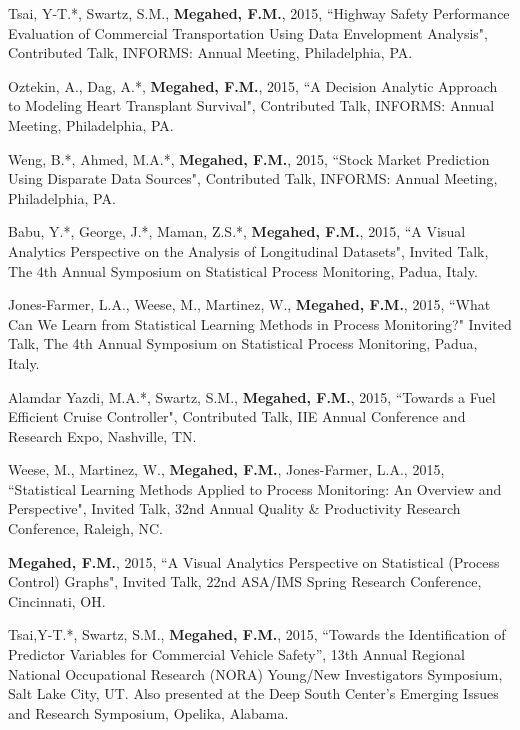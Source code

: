 \documentclass[margin,line]{res}
\begin{document}
\begin{resume}
\vspace{-1.5mm} 
Tsai, Y-T.*, Swartz, S.M., \textbf{Megahed, F.M.}, 2015, ``Highway Safety Performance Evaluation of Commercial Transportation Using Data Envelopment Analysis", Contributed Talk, INFORMS: Annual Meeting, Philadelphia, PA.

\vspace{-1.5mm} 
Oztekin, A., Dag, A.*, \textbf{Megahed, F.M.}, 2015, ``A Decision Analytic Approach to Modeling Heart Transplant Survival", Contributed Talk, INFORMS: Annual Meeting, Philadelphia, PA.

\vspace{-1.5mm} 
Weng, B.*, Ahmed, M.A.*, \textbf{Megahed, F.M.}, 2015, ``Stock Market Prediction Using Disparate Data Sources", Contributed Talk, INFORMS: Annual Meeting, Philadelphia, PA.

\vspace{-1.5mm} 
Babu, Y.*, George, J.*, Maman, Z.S.*, \textbf{Megahed, F.M.}, 2015, ``A Visual Analytics Perspective on the Analysis of Longitudinal Datasets", Invited Talk, The 4th Annual Symposium on Statistical Process Monitoring, Padua, Italy.

\vspace{-1.5mm} 
Jones-Farmer, L.A., Weese, M., Martinez, W., \textbf{Megahed, F.M.}, 2015, ``What Can We Learn from Statistical Learning Methods in Process Monitoring?" Invited Talk, The 4th Annual Symposium on Statistical Process Monitoring, Padua, Italy.

\vspace{-1.5mm} 
Alamdar Yazdi, M.A.*, Swartz, S.M., \textbf{Megahed, F.M.}, 2015, ``Towards a Fuel Efficient Cruise Controller", Contributed Talk, IIE Annual Conference and Research Expo, Nashville, TN.

\vspace{-1.5mm} 
Weese, M., Martinez, W., \textbf{Megahed, F.M.}, Jones-Farmer, L.A., 2015, ``Statistical Learning Methods Applied to Process Monitoring: An Overview and Perspective", Invited Talk, 32nd Annual Quality \& Productivity Research Conference, Raleigh, NC.

\vspace{-1.5mm}
\textbf{Megahed, F.M.}, 2015, ``A Visual Analytics Perspective on Statistical (Process Control) Graphs", Invited Talk, 22nd ASA/IMS Spring Research Conference, Cincinnati, OH.

\vspace{-1.5mm}
Tsai,Y-T.*, Swartz, S.M., \textbf{Megahed, F.M.}, 2015, “Towards the Identification of Predictor Variables for Commercial Vehicle Safety”,  13th Annual Regional National Occupational Research (NORA) Young/New Investigators Symposium, Salt Lake City, UT. Also presented at the Deep South Center's Emerging Issues and Research Symposium, Opelika, Alabama.


\end{resume}
\end{document}
